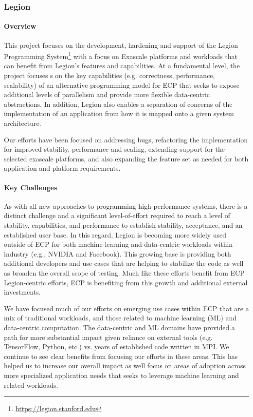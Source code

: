 \subsubsection{ Legion}

\paragraph{Overview}
This project focuses on the development, hardening and support of the
Legion Programming System\footnote{\url{https://legion.stanford.edu}} with a
focus on Exascale platforms and workloads that can benefit from
Legion's features and capabilities.  At a fundamental level, the
project focuses s on the key capabilities (e.g. correctness,
performance, scalability) of an alternative programming model for ECP
that seeks to expose additional levels of parallelism and provide more
flexible data-centric abstractions.  In addition, Legion also enables
a separation of concerns of the implementation of an application from
how it is mapped onto a given system architecture.

Our efforts have been focused on addressing bugs, refactoring the
implementation for improved stability, performance and scaling,
extending support for the selected exascale platforms, and also
expanding the feature set as needed for both application and
platform requirements.

\paragraph{Key Challenges}
As with all new approaches to programming high-performance systems,
there is a distinct challenge and a significant level-of-effort required to
reach a level of stability, capabilities, and performance to establish
stability, acceptance, and an established user base.  In this
regard, Legion is becoming more widely used outside of ECP for both
machine-learning and data-centric workloads within industry (e.g.,
NVIDIA and Facebook).  This growing base is providing both additional
developers and use cases that are helping to stabilize the code as
well as broaden the overall scope of testing.  Much like these efforts
benefit from ECP Legion-centric efforts, ECP is benefiting from this
growth and additional external investments.

We have focused much of our efforts on emerging use cases within ECP
that are a mix of traditional workloads, and those related to machine
learning (ML) and data-centric computation.  The data-centric and ML
domains have provided a path for more substantial impact given reliance
on external tools (e.g. TensorFlow, Python, etc.) vs. years of established code
written in MPI.  We continue to see clear benefits from focusing our efforts in
these areas. This has helped us to increase our overall impact as well focus on
areas of adoption across more specialized application needs that seeks to leverage
machine learning and related workloads.

